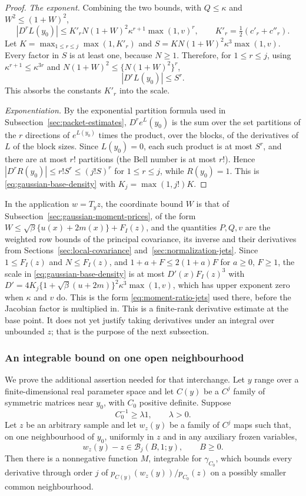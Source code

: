 \begin{proof}
\emph{The exponent.} Combining the two bounds, with $Q\le\kappa$ and
$W^2\le(1+W)^2$,
\[
 |D^rL(y_0)|\le K'_rN(1+W)^2\kappa^{r+1}\max(1,v)^r,\qquad
 K'_r=\tfrac12(c'_r+c''_r).
\]
Let $K=\max_{1\le r\le j}\max(1,K'_r)$ and
$S=KN(1+W)^2\kappa^3\max(1,v)$. Every factor in $S$ is at least one,
because $N\ge1$. Therefore, for $1\le r\le j$, using $\kappa^{r+1}\le
\kappa^{3r}$ and $N(1+W)^2\le\{N(1+W)^2\}^r$,
\[
 |D^rL(y_0)|\le S^r .
\]
This absorbs the constants $K'_r$ into the scale.

\emph{Exponentiation.} By the exponential partition formula used in
Subsection~\ref{sec:packet-estimates}, $D^re^L(y_0)$ is the sum over the
set partitions of the $r$ directions of $e^{L(y_0)}$ times the product,
over the blocks, of the derivatives of $L$ of the block sizes. Since
$L(y_0)=0$, each such product is at most $S^r$, and there are at most
$r!$ partitions (the Bell number is at most $r!$). Hence
$|D^rR(y_0)|\le r!S^r\le(j!S)^r$ for $1\le r\le j$, while $R(y_0)=1$.
This is \eqref{eq:gaussian-base-density} with $K_j=\max(1,j!)K$.
\end{proof}

In the application $w=T_yz$, the coordinate bound $W$ is that of
Subsection~\ref{sec:gaussian-moment-prices}, of the form
$W\le\sqrt\beta\{u(x)+2m(x)\}+F_I(z)$, and the quantities $P,Q,v$ are
the weighted row bounds of the principal covariance, its inverse and
their derivatives from Sections~\ref{sec:local-covariance}
and~\ref{sec:normalization-jets}. Since $1\le F_I(z)$ and $N\le F_I(z)$,
and $1+a+F\le2(1+a)F$ for $a\ge0$, $F\ge1$, the scale in
\eqref{eq:gaussian-base-density} is at most $D'(x)F_I(z)^3$ with
$D'=4K_j\{1+\sqrt\beta(u+2m)\}^2\kappa^3\max(1,v)$, which has
upper exponent zero when $\kappa$ and $v$ do.
This is the form \eqref{eq:moment-ratio-jets} used there, before the
Jacobian factor is multiplied in. This is a finite-rank derivative
estimate at the base point. It does not yet justify taking derivatives
under an integral over unbounded $z$; that is the purpose of the next
subsection.

\subsubsection{An integrable bound on one open neighbourhood}
We prove the additional assertion needed for that interchange.
Let $y$ range over a finite-dimensional real parameter space and
let $C(y)$ be a $C^j$ family of symmetric matrices near $y_0$,
with $C_0$ positive definite. Suppose
\[
 C_0^{-1}\ge\lambda 1,\qquad\lambda>0.
\]
Let $z$ be an arbitrary sample and let $w_z(y)$ be a family of
$C^j$ maps such that, on one neighbourhood of $y_0$, uniformly in
$z$ and in any auxiliary frozen variables,
\begin{equation}\label{eq:gaussian-bounded-displacement}
 w_z(y)-z\in\mathcal B_j(B,1;y),\qquad B\ge0.
\end{equation}
Then there is a nonnegative function $M$, integrable for
$\gamma_{C_0}$, which bounds every derivative through order $j$ of
$p_{C(y)}(w_z(y))/p_{C_0}(z)$ on a possibly smaller common
neighbourhood.

